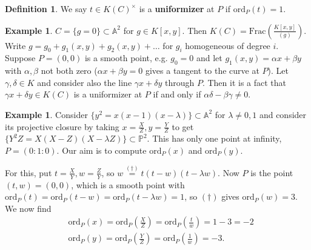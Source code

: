 \documentclass{article}
\theoremstyle{definition}
\newtheorem{example}[theorem]{Example}
\newtheorem{defn}{Definition}[section]
\begin{document}
\begin{defn}
    We say $t \in K(C)^\times$ is a \textbf{uniformizer} at $P$ if $\text{ord}_P(t)=1$.
\end{defn}
\begin{example}
    $C =\{g = 0\} \subset \mathbb{A}^2$ for $g \in K[x,y]$. Then $K(C) = \text{Frac}\left(\frac{K[x,y]}{(g)}\right)$. Write $g = g_0+g_1(x,y) + g_2(x,y) + \ldots$ for $g_i$ homogeneous of degree $i$. Suppose $P = (0,0)$ is a smooth point, e.g. $g_0=0$ and let $g_1(x,y)=\alpha x + \beta y$ with $\alpha,\beta$ not both zero ($\alpha x + \beta y =0$ gives a tangent to the curve at $P$). Let $\gamma,\delta \in K$ and consider also the line $\gamma x + \delta y$ through $P$. Then it is a fact that $\gamma x + \delta y \in K(C)$ is a uniformizer at $P$ if and only if $\alpha \delta - \beta \gamma \neq 0$. 
\end{example}
\begin{example}\label{ex2.3}
    Consider $\{y^2 = x(x-1)(x-\lambda)\} \subset \mathbb{A}^2$ for $\lambda \neq 0,1$ and consider its projective closure by taking $x =\frac{X}{Z}, y = \frac{Y}{Z}$ to get $\{Y^2Z = X(X-Z)(X-\lambda Z)\} \subset \mathbb{P}^2$. This has only one point at infinity, $P = (0 : 1 : 0)$. Our aim is to compute $\text{ord}_P(x)$ and $\text{ord}_P(y)$.
    \vspace{1mm}
     
    For this, put $t = \frac{X}{Y}, w =\frac{Z}{Y}$, so $w \stackrel{(\dagger)}{=}  t(t-w)(t-\lambda w) $. Now $P$ is the point $(t,w) = (0,0)$, which is a smooth point with $\text{ord}_P(t) = \text{ord}_P(t-w) = \text{ord}_P(t-\lambda w) = 1$, so $(\dagger)$ gives $\text{ord}_P(w) = 3$. We now find
    \begin{align*}
        &\text{ord}_P(x) = \text{ord}_P\left(\frac{X}{Z}\right) = \text{ord}_P\left(\frac{t}{w}\right) = 1-3 = -2\\
        &\text{ord}_P(y) = \text{ord}_P\left(\frac{Y}{Z}\right) = \text{ord}_P\left(\frac{1}{w}\right) = -3.
    \end{align*}
\end{example}
\end{document}
